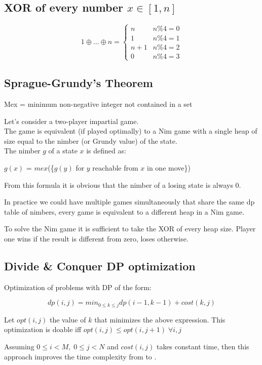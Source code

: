 \subsection{XOR of every number $x \in [1, n]$}
\[1 \oplus \ldots \oplus n =
	\begin{cases}
		n & n \% 4 = 0 \\
		1 & n \% 4 = 1 \\
		n + 1 & n \% 4 = 2 \\
		0 & n \% 4 = 3
	\end{cases}
\]


\subsection{Sprague-Grundy's Theorem}
Mex = minimum non-negative integer not contained in a set

Let's consider a two-player impartial game. \\
The game is equivalent (if played optimally) to a Nim game with a single
heap of size equal to the nimber (or Grundy value) of the state. \\
The nimber $g$ of a state $x$ is defined as:

$g(x)$ = $mex$(\{$g(y)$ for $y$ reachable from $x$ in one move\})

From this formula it is obvious that the nimber of a losing state is always 0.

In practice we could have multiple games simultaneously that share the same
dp table of nimbers, every game is equivalent to a different heap in a Nim game.

To solve the Nim game it is sufficient to take the XOR of every heap size.
Player one wins if the result is different from zero, loses otherwise.


\subsection{Divide \& Conquer DP optimization}
Optimization of problems with DP of the form:

\[dp(i, j) = min_{0 \leq k \leq j}dp(i - 1, k - 1) + cost(k, j)\]

Let $opt(i, j)$ the value of $k$ that minimizes the above expression.
This optimization is doable iff $opt(i, j) \leq opt(i, j + 1) \; \forall i, j$

Assuming $0 \leq i < M, \; 0 \leq j < N$ and $cost(i, j)$ takes constant time,
then this approach improves the time complexity from  to .

